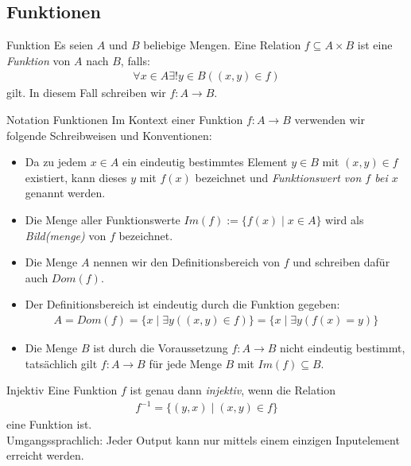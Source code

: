 \subsection{Funktionen}

\begin{definition}{Funktion}
    Es seien $A$ und $B$ beliebige Mengen. Eine Relation $f\subseteq A\times B$ ist eine \textit{Funktion} von $A$ nach $B$, falls:
    \begin{align*}
    \forall x\in A\exists!y\in B((x,y)\in f)
    \end{align*}
    gilt. In diesem Fall schreiben wir $f:A\to B.$
\end{definition}

\begin{concept}{Notation Funktionen}
    Im Kontext einer Funktion $f:A\to B$ verwenden wir folgende Schreibweisen und Konventionen:
    \begin{itemize}
        \item Da zu jedem $x\in A$ ein eindeutig bestimmtes Element $y\in B$ mit $(x,y)\in f$ existiert, kann dieses $y$ mit $f(x)$ bezeichnet und \textit{Funktionswert von $f$ bei $x$} genannt werden.
        \item Die Menge aller Funktionswerte $Im(f) := \{f(x)\mid x\in A \}$ wird als \textit{Bild(menge)} von $f$ bezeichnet.
        \item Die Menge $A$ nennen wir den Definitionsbereich von $f$ und schreiben dafür auch $Dom(f)$.
        \item Der Definitionsbereich ist eindeutig durch die Funktion gegeben:
        \begin{align*}
            A=Dom(f)=\{x\mid \exists y ((x,y)\in f) \}=\{x\mid \exists y (f(x)=y )\}
        \end{align*}
        \item Die Menge $B$ ist durch die Voraussetzung $f:A\to B$ nicht eindeutig bestimmt, tatsächlich gilt $f:A\to B$ für jede Menge $B$ mit $Im(f)\subseteq B$.
    \end{itemize}
\end{concept}

\begin{definition}{Injektiv}
    Eine Funktion $f$ ist genau dann \textit{injektiv}, wenn die Relation
    \begin{align*}
        f^{-1}=\{(y,x)\mid (x,y)\in f\}
    \end{align*}
    eine Funktion ist.\\
    Umgangssprachlich: Jeder Output kann nur mittels einem einzigen Inputelement erreicht werden.
\end{definition}

